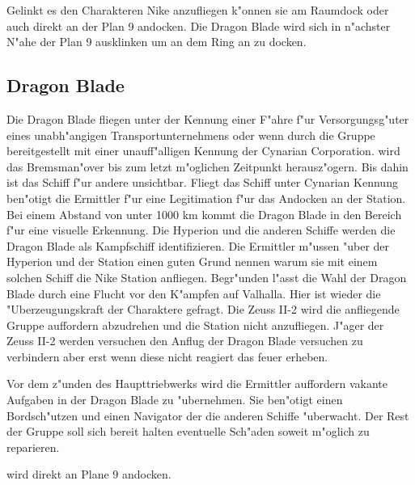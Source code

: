 Gelinkt es den Charakteren Nike anzufliegen k"onnen sie am Raumdock oder auch direkt an der Plan 9 andocken. Die Dragon Blade wird sich in n"achster N"ahe der Plan 9 ausklinken um an dem Ring an zu docken.

\subsection{Dragon Blade}
Die Dragon Blade fliegen unter der Kennung einer F"ahre f"ur Versorgungsg"uter eines unabh"angigen Transportunternehmens oder wenn durch die Gruppe bereitgestellt mit einer unauff"alligen Kennung der Cynarian Corporation. \xl{} wird das Bremsman"over bis zum letzt m"oglichen Zeitpunkt herausz"ogern. Bis dahin ist das Schiff f"ur andere unsichtbar. Fliegt das Schiff unter Cynarian Kennung ben"otigt \xl{} die Ermittler f"ur eine Legitimation f"ur das Andocken an der Station. Bei einem Abstand von unter 1000 km kommt die Dragon Blade in den Bereich f"ur eine visuelle Erkennung. Die Hyperion und die anderen Schiffe werden die Dragon Blade als Kampfschiff identifizieren. Die Ermittler m"ussen "uber der Hyperion und der Station einen guten Grund nennen warum sie mit einem solchen Schiff die Nike Station anfliegen. Begr"unden l"asst die Wahl der Dragon Blade durch eine Flucht vor den K"ampfen auf Valhalla. Hier ist wieder die "Uberzeugungskraft der Charaktere gefragt. Die Zeuss II-2 wird die anfliegende Gruppe auffordern abzudrehen und die Station nicht anzufliegen. J"ager der Zeuss II-2 werden versuchen den Anflug der Dragon Blade versuchen zu verbindern aber erst wenn diese nicht reagiert das feuer erheben. 

Vor dem z"unden des Haupttriebwerks wird \xl{} die Ermittler auffordern vakante Aufgaben in der Dragon Blade zu "ubernehmen. Sie ben"otigt einen Bordsch"utzen und einen Navigator der die anderen Schiffe "uberwacht. Der Rest der Gruppe soll sich bereit halten eventuelle Sch"aden soweit m"oglich zu reparieren.

\xl{} wird direkt an Plane 9 andocken.
\vfill

